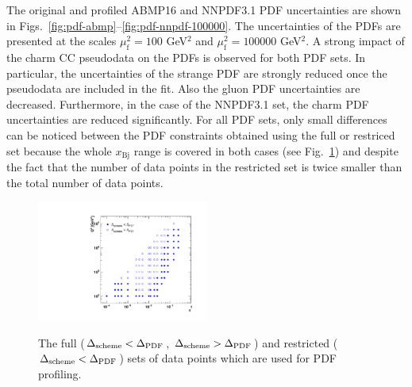 \documentclass[pdftex,twocolumn,epjc3]{svjour3}          %
\newcommand{\abmp} {ABMP16\xspace}
\newcommand{\nnpdf} {NNPDF3.1\xspace}
\newcommand{\xbj}{\ensuremath{x_{\text{Bj}}}\xspace}
\newcommand\new[1]{{\color{blue} #1}}
\begin{document}
The original and profiled \abmp and \nnpdf PDF uncertainties are shown
in Figs.~\ref{fig:pdf-abmp}--\ref{fig:pdf-nnpdf-100000}.  The
uncertainties of the PDFs are presented at the scales
$\mu_\mathrm{f}^2=100$ GeV$^2$ and $\mu_\mathrm{f}^2=100000$ GeV$^2$.
A strong impact of the charm CC pseudodata on the PDFs is observed for
both PDF sets.  In particular, the uncertainties of the strange PDF
are strongly reduced once the pseudodata are included in the fit.
Also the gluon PDF uncertainties are decreased. Furthermore, in the
case of the NNPDF3.1 set, the charm PDF uncertainties are reduced
significantly. \new{For all PDF sets, only small differences can be noticed 
between the PDF constraints obtained using the full or restriced set 
because the whole \xbj range is covered in both cases (see Fig.~\ref{fig:data}) and 
despite the fact that the number of data points in the restricted set is 
twice smaller than the total number of data points.}

\begin{figure}
  \centering
  {{\includegraphics[width=0.5\textwidth]{pics/pseudodata.pdf}}}
  \caption{The full ($\Delta_{\rm scheme} < \Delta_{\rm PDF}$, $\Delta_{\rm scheme} > \Delta_{\rm PDF}$) and restricted ($\Delta_{\rm scheme} < \Delta_{\rm PDF}$) sets of data points which are used for PDF profiling.}
  \label{fig:data}
\end{figure}
\end{document}
